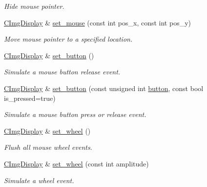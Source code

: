 \begin{DoxyCompactItemize}
\begin{DoxyCompactList}\small\item\em Hide mouse pointer. \end{DoxyCompactList}\item 
\hyperlink{structcimg__library__suffixed_1_1CImgDisplay}{C\+Img\+Display} \& \hyperlink{structcimg__library__suffixed_1_1CImgDisplay_a3506d159167c9378c34e20c09228acf1}{set\+\_\+mouse} (const int pos\+\_\+x, const int pos\+\_\+y)
\begin{DoxyCompactList}\small\item\em Move mouse pointer to a specified location. \end{DoxyCompactList}\item 
\hyperlink{structcimg__library__suffixed_1_1CImgDisplay}{C\+Img\+Display} \& \hyperlink{structcimg__library__suffixed_1_1CImgDisplay_a9626cbb82f0db7c2f8a9936822e62125}{set\+\_\+button} ()
\begin{DoxyCompactList}\small\item\em Simulate a mouse button release event. \end{DoxyCompactList}\item 
\hyperlink{structcimg__library__suffixed_1_1CImgDisplay}{C\+Img\+Display} \& \hyperlink{structcimg__library__suffixed_1_1CImgDisplay_a940f41b7e04ec77be7646f87de38b619}{set\+\_\+button} (const unsigned int \hyperlink{structcimg__library__suffixed_1_1CImgDisplay_a78f937ad8000675d0293a8d7e20627fa}{button}, const bool is\+\_\+pressed=true)
\begin{DoxyCompactList}\small\item\em Simulate a mouse button press or release event. \end{DoxyCompactList}\item 
\hyperlink{structcimg__library__suffixed_1_1CImgDisplay}{C\+Img\+Display} \& \hyperlink{structcimg__library__suffixed_1_1CImgDisplay_a4ce1d2c8224658626b37215edfe58ad8}{set\+\_\+wheel} ()
\begin{DoxyCompactList}\small\item\em Flush all mouse wheel events. \end{DoxyCompactList}\item 
\hyperlink{structcimg__library__suffixed_1_1CImgDisplay}{C\+Img\+Display} \& \hyperlink{structcimg__library__suffixed_1_1CImgDisplay_a186d7f873b9a3340900a46149533cb4f}{set\+\_\+wheel} (const int amplitude)
\begin{DoxyCompactList}\small\item\em Simulate a wheel event. \end{DoxyCompactList}\item 

\end{DoxyCompactItemize}
